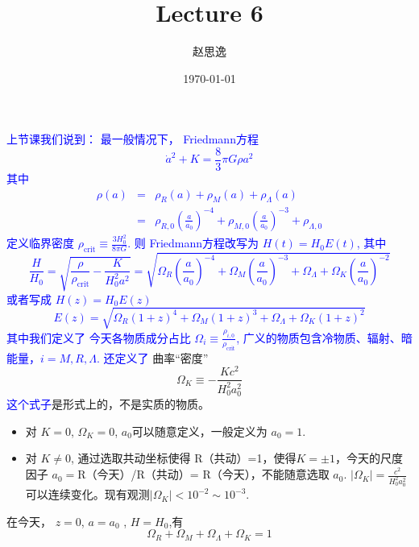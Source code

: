\documentclass[12pt]{ctexart}
\title{Lecture 6}
\author{赵思逸}
\date{\today}
\newcommand{\new}[1]{\textcolor{blue}{#1}}
\begin{document}
\maketitle

\new{
上节课我们说到：
最一般情况下，
Friedmann方程
\begin{equation}
    \dot{a}^2+K = \frac{8}{3} \pi G \rho a^2
\end{equation}
其中 
\begin{eqnarray}
    \rho(a) &=& \rho_R(a) + \rho_M(a) + \rho_\Lambda (a) \label{eq:rho}
    \\ &=& \rho_{R,0}\left(\frac{a}{a_0}\right)^{-4} + \rho_{M,0}\left(\frac{a}{a_0}\right)^{-3}  + \rho_{\Lambda,0}     
\end{eqnarray}
定义临界密度 $\rho_\text{crit} \equiv \frac{3H_0^2}{8\pi G}$.
则
Friedmann方程改写为 $H(t)= H_0 E(t)$,   其中 
\begin{equation}
    \frac{H}{H_0} = \sqrt{\frac{\rho}{\rho_\text{crit}}-\frac{K}{H_0^2 a^2}} =\sqrt{\Omega_R\left(\frac{a}{a_0}\right)^{-4}+\Omega_M\left(\frac{a}{a_0}\right)^{-3}+\Omega_\Lambda+\Omega_K\left(\frac{a}{a_0}\right)^{-2}}
\end{equation}
或者写成
$H(z)=H_0 E(z)$
\begin{equation}
    E(z) = \sqrt{ \Omega_R \left(1+z\right)^{4} + \Omega_M \left(1+z\right)^{3} + \Omega_\Lambda + \Omega_K \left(1+z\right)^{2} }
\end{equation}
其中我们定义了
今天各物质成分占比 $\Omega_i\equiv\frac{\rho_{i,0}}{\rho_\text{crit}}$, 
广义的物质包含冷物质、辐射、暗能量，$i=M,R,\Lambda$.
还定义了
}
曲率“密度” 
\begin{equation}
    \Omega_K\equiv-\frac{Kc^2}{H_0^2a_0^2}
\end{equation}
\new{这个式子}是形式上的，不是实质的物质。
\begin{itemize}
    \item 对 $K=0$, $\Omega_K=0$, $a_0$可以随意定义，一般定义为 $a_0=1$.
    \item 对 $K\neq0$, 通过选取共动坐标使得 R（共动）=1，使得$K=\pm 1$，今天的尺度因子 $a_0=$R（今天）/R（共动）= R（今天），不能随意选取 $a_0$. $|\Omega_K|=\frac{c^2}{H_0^2a_0^2}$ 可以连续变化。现有观测$|\Omega_K|< 10^{-2}\sim 10^{-3}$.
\end{itemize} 

在今天， $z=0$, $a=a_0$ , $H=H_0$,有
\begin{equation}
    \Omega_R + \Omega_M + \Omega_\Lambda + \Omega_K = 1 \label{eq:allOmega}
\end{equation}
\end{document}
